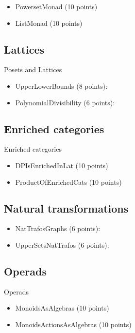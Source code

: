 \begin{itemize}
    \item PowersetMonad (10 points)  
    \item ListMonad (10 points) 
\end{itemize}

\subsection{Lattices}

Posets and Lattices
\begin{itemize}
    \item UpperLowerBounds (8 points): 
    \item PolynomialDivisibility (6 points):  
\end{itemize}

\subsection{Enriched categories}
Enriched categories
\begin{itemize}
    \item DPIsEnrichedInLat (10 points)  
    \item ProductOfEnrichedCats (10 points) 
\end{itemize}

\subsection{Natural transformations}

\begin{itemize}
    \item NatTrafosGraphs (6 points): 
    \item UpperSetsNatTrafos (6 points): 
\end{itemize}

\subsection{Operads}

Operads
\begin{itemize}
    \item MonoidsAsAlgebras (10 points)  
    \item MonoidsActionsAsAlgebras (10 points) 
\end{itemize}

